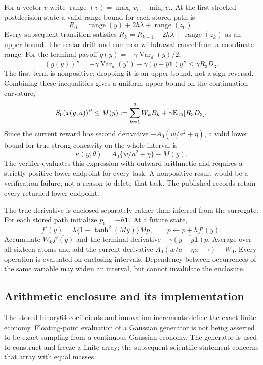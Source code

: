 For a vector $v$ write $\operatorname{range}(v)=\max_i v_i-\min_i v_i$.
At the first shocked postdecision state a valid range bound for each stored
path is
\[
 R_0=\operatorname{range}(y)+2h\lambda+
                       \operatorname{range}(z_0).
\]
Every subsequent transition satisfies
$R_k=R_{k-1}+2h\lambda+\operatorname{range}(z_k)$ as an upper bound.
The scalar drift and common withdrawal cancel from a coordinate range.
For the terminal payoff $g(y)=-\gamma\operatorname{Var}_d(y)/2$,
\[
 (g(y))''=-\gamma\operatorname{Var}_d(y')
 -\gamma\overline{(y-\overline y\bm1)y''}
 \leq\gamma R_3D_3.
\]
The first term is nonpositive; dropping it is an upper bound, not a sign
reversal. Combining these inequalities gives a uniform upper bound on the
continuation curvature,
\[
 S_0(x(y,a))''\leq
 M(y):=\sum_{k=1}^{3}W_kB_k+\gamma\mathbb E_{16}[R_3D_3].
\]
Since the current reward has second derivative
$-A_0(w/a^2+\eta)$, a valid lower bound for true strong concavity on the
whole interval is
\begin{equation}
 \kappa(y,\theta)=A_0\{w/\bar a^2+\eta\}-M(y).
 \label{eq:r19kappa}
\end{equation}
The verifier evaluates this expression with outward arithmetic and requires
a strictly positive lower endpoint for every task. A nonpositive result
would be a verification failure, not a reason to delete that task. The
published records retain every returned lower endpoint.

The true derivative is enclosed separately rather than inferred from the
surrogate. For each stored path initialize $p_0=-h\bm1$. At a future state,
\[
 f'(y)=\lambda\{1-\tanh^2(My)\}Mp,\qquad
 p\leftarrow p+h f'(y).
\]
Accumulate $W_k\overline{f'(y)}$ and the terminal derivative
$-\gamma\overline{(y-\overline y\bm1)p}$. Average over all sixteen atoms
and add the current derivative
$A_0(w/a-\eta a-\tau)-W_0$. Every operation is evaluated on enclosing
intervals. Dependency between occurrences of the same variable may widen
an interval, but cannot invalidate the enclosure.

\subsection{Arithmetic enclosure and its implementation}
The stored binary64 coefficients and innovation increments define the exact
finite economy. Floating-point evaluation of a Gaussian generator is not
being asserted to be exact sampling from a continuous Gaussian economy.
The generator is used to construct and freeze a finite array; the subsequent
scientific statement concerns that array with equal masses.

